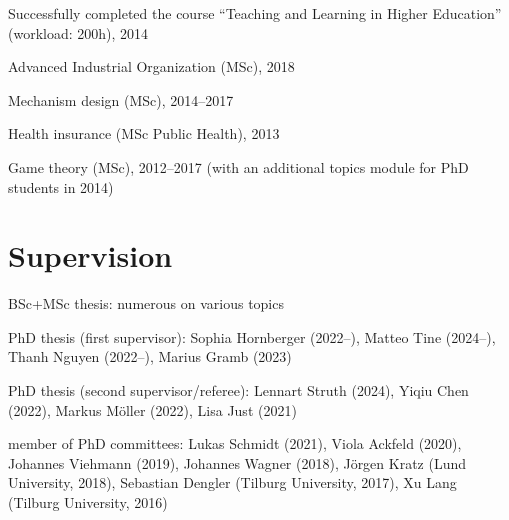 \documentclass[a4paper]{article}
\renewenvironment{itemize}{
  \begin{list}{}{
    \setlength{\leftmargin}{1.5em}
  }
}{
  \end{list}
}
\begin{document}
Successfully completed the course ``Teaching and Learning in Higher Education'' (workload: 200h), 2014

\begin{itemize}
  \item Advanced Industrial Organization (MSc), 2018
\item Mechanism design (MSc), 2014--2017
\item Health insurance (MSc Public Health), 2013
\item Game theory (MSc), 2012--2017 (with an additional topics module for PhD students in 2014)
\end{itemize}





\section*{Supervision}

\begin{itemize}
\item BSc+MSc thesis: numerous on various topics
\item PhD thesis (first supervisor): Sophia Hornberger (2022--), Matteo Tine (2024--), Thanh Nguyen (2022--), Marius Gramb (2023)
\item PhD thesis (second supervisor/referee):  Lennart Struth (2024), Yiqiu Chen (2022), Markus M\"oller (2022), Lisa Just (2021)
\item member of PhD committees: Lukas Schmidt (2021), Viola Ackfeld (2020), Johannes Viehmann (2019), Johannes Wagner (2018), J\"orgen Kratz (Lund University, 2018), Sebastian Dengler (Tilburg University, 2017), Xu Lang (Tilburg University, 2016)
\end{itemize}
\end{document}
